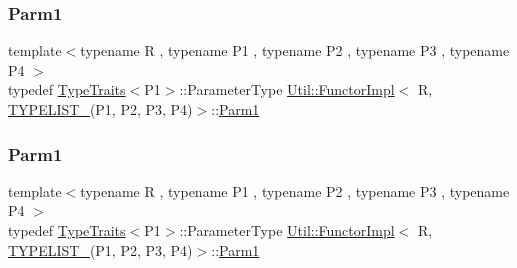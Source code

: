 \subsubsection{\texorpdfstring{Parm1}{Parm1}\hspace{0.1cm}{\footnotesize\ttfamily [1/3]}}
{\footnotesize\ttfamily template$<$typename R , typename P1 , typename P2 , typename P3 , typename P4 $>$ \\
typedef \mbox{\hyperlink{classUtil_1_1TypeTraits}{Type\+Traits}}$<$P1$>$\+::Parameter\+Type \mbox{\hyperlink{classUtil_1_1FunctorImpl}{Util\+::\+Functor\+Impl}}$<$ R, \mbox{\hyperlink{adat__devel__install_2include_2adat_2typelist_8h_a7a156c571ab21a16b0495e1c882a07fa}{T\+Y\+P\+E\+L\+I\+S\+T\+\_}}(P1, P2, P3, P4)$>$\+::\mbox{\hyperlink{structUtil_1_1Private_1_1FunctorImplBase_a9d61e693d6c616dea5bd9d9073c7d21a}{Parm1}}}

\mbox{\label{classUtil_1_1FunctorImpl_3_01R_00_01TYPELIST__4_07P1_00_01P2_00_01P3_00_01P4_08_4_ab22bf7d6b59a883bb4a582f3a8ceaccc}} 
\subsubsection{\texorpdfstring{Parm1}{Parm1}\hspace{0.1cm}{\footnotesize\ttfamily [2/3]}}
{\footnotesize\ttfamily template$<$typename R , typename P1 , typename P2 , typename P3 , typename P4 $>$ \\
typedef \mbox{\hyperlink{classUtil_1_1TypeTraits}{Type\+Traits}}$<$P1$>$\+::Parameter\+Type \mbox{\hyperlink{classUtil_1_1FunctorImpl}{Util\+::\+Functor\+Impl}}$<$ R, \mbox{\hyperlink{adat__devel__install_2include_2adat_2typelist_8h_a7a156c571ab21a16b0495e1c882a07fa}{T\+Y\+P\+E\+L\+I\+S\+T\+\_}}(P1, P2, P3, P4)$>$\+::\mbox{\hyperlink{structUtil_1_1Private_1_1FunctorImplBase_a9d61e693d6c616dea5bd9d9073c7d21a}{Parm1}}}

\mbox{\label{classUtil_1_1FunctorImpl_3_01R_00_01TYPELIST__4_07P1_00_01P2_00_01P3_00_01P4_08_4_ab22bf7d6b59a883bb4a582f3a8ceaccc}} 
